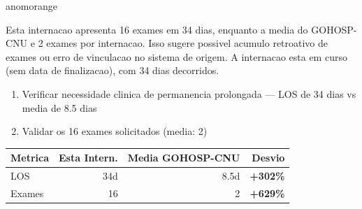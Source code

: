 \documentclass[a4paper,10pt]{article}
\begin{document}
\begin{anomalycard}[Internacao 261655 | GOHOSP-CNU | ALTO (z=3.74)]{anomorange}
\vspace{2pt}\begin{tcolorbox}[colback=severityred!20,colframe=anomorange,title={\textbf{Interpretacao de Negocio}},fonttitle=\bfseries\small,left=4pt,right=4pt,top=3pt,bottom=3pt]
{\small Esta internacao apresenta 16 exames em 34 dias, enquanto a media do GOHOSP-CNU e 2 exames por internacao. Isso sugere possivel acumulo retroativo de exames ou erro de vinculacao no sistema de origem. A internacao esta em curso (sem data de finalizacao), com 34 dias decorridos.}
\end{tcolorbox}
\begin{tcolorbox}[colback=severityyellow!30,colframe=anomorange,title={\textbf{Recomendacoes Especificas}},fonttitle=\bfseries\small,left=4pt,right=4pt,top=3pt,bottom=3pt]
\begin{enumerate}[nosep,leftmargin=16pt]
\item {\small Verificar necessidade clinica de permanencia prolongada --- LOS de 34 dias vs media de 8.5 dias}
\item {\small Validar os 16 exames solicitados (media: 2)}
\end{enumerate}
\end{tcolorbox}
\begin{center}\begin{tabular}{l r r r}\toprule\textbf{Metrica} & \textbf{Esta Intern.} & \textbf{Media GOHOSP-CNU} & \textbf{Desvio} \\\midrule
LOS & 34d & 8.5d & \textcolor{anomred}{\textbf{+302\%}} \\
Exames & 16 & 2 & \textcolor{anomred}{\textbf{+629\%}} \\
\bottomrule\end{tabular}\end{center}


\end{anomalycard}
\end{document}
